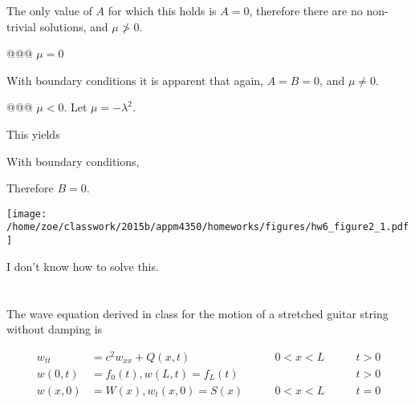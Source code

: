 \documentclass[10pt]{article}
\begin{document}
\begin{easylist}[enumerate]

    The only value of $A$ for which this holds is $A = 0$, therefore there are no non-trivial solutions, and
    $\mu\not>0$.

    @@@ $\mu = 0$


    With boundary conditions it is apparent that again, $A = B = 0$, and $\mu\neq0$.

    @@@ $\mu < 0$. Let $\mu = -\lambda^2$.

    This yields


    With boundary conditions,


    Therefore $B = 0$.


\simpleweave

\texttt{[image: /home/zoe/classwork/2015b/appm4350/homeworks/figures/hw6\_figure2\_1.pdf]}

\nosimpleweave

    I don't know how to solve this.

\end{easylist}

\newpage
\section{}

The wave equation derived in class for the motion of a stretched guitar string without damping is

\begin{align*}
    w_{tt} &= c^2 w_{xx} + Q(x, t) \qquad & 0 < x < L \qquad & t > 0\\
    w(0, t) &= f_0(t), w(L, t) = f_L(t) \qquad && t > 0\\
    w(x, 0) &= W(x), w_t(x, 0) = S(x) \qquad & 0 < x < L \qquad & t = 0\\
\end{align*}
\end{document}
